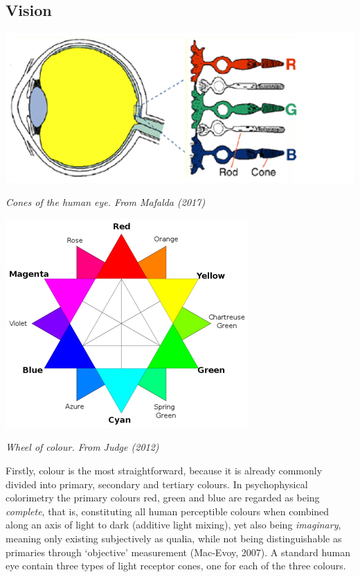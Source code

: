 \subsection{Vision}

\begin{center}
\includegraphics[scale=0.3]{./Images/eyes.jpeg}

{\it \footnotesize Cones of the human eye. From Mafalda (2017)}

\includegraphics[scale=0.4]{./Images/colorwheel.jpg}

{\it \footnotesize Wheel of colour. From Judge (2012)}
\end{center}

\noindent Firstly, colour is the most straightforward, because it is already commonly divided into primary, secondary and tertiary colours. In psychophysical colorimetry the primary colours red, green and blue are regarded as being \textit{complete}, that is, constituting all human perceptible colours when combined along an axis of light to dark (additive light mixing), yet also being \textit{imaginary}, meaning only existing subjectively as qualia, while not being distinguishable as primaries through ‘objective’ measurement (Mac-Evoy, 2007). A standard human eye contain three types of light receptor cones, one for each of the three colours. 

